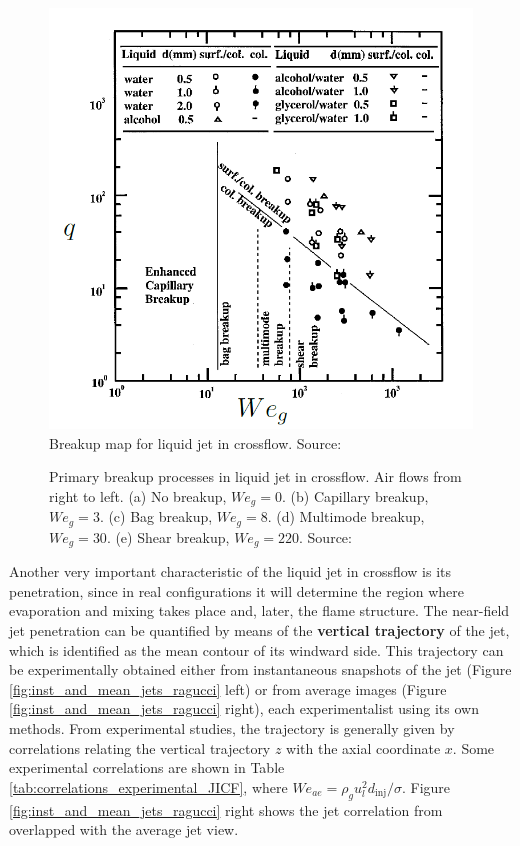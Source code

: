 \begin{figure}[h!]
	\centering
	\includegraphics[scale=0.55]{./part0_intro/jicf_breakup_regime_wu}
	\caption{Breakup map for liquid jet in crossflow. Source: \citeColor[wu_breakup_1997]}
	\label{fig:jicf_breakup_regime_wu}
\end{figure}

\begin{figure}[h!]
	\centering
	\caption[Primary breakup processes in liquid jet in crossflow]{Primary breakup processes in liquid jet in crossflow. Air flows from right to left. (a) No breakup, $We_g = 0$. (b) Capillary breakup, $We_g = 3$. (c) Bag breakup, $We_g = 8$. (d) Multimode breakup, $We_g = 30$. (e) Shear breakup, $We_g = 220$. Source: }
	\label{fig:jicf_breakup_sallam}
\end{figure}

Another very important characteristic of the liquid jet in crossflow is its penetration, since in real configurations it will determine the region where evaporation and mixing takes place and, later, the flame structure. The near-field jet penetration can be quantified by means of the \textbf{vertical trajectory} of the jet, which is identified as the mean contour of its windward side. This trajectory can be experimentally obtained either from instantaneous snapshots of the jet (Figure \ref{fig:inst_and_mean_jets_ragucci} left) or from average images (Figure \ref{fig:inst_and_mean_jets_ragucci} right), each experimentalist using its own methods. From experimental studies, the trajectory is generally given by correlations relating the vertical trajectory $z$ with the axial coordinate $x$. Some experimental correlations are shown in Table \ref{tab:correlations_experimental_JICF}, where $We_{ae} = \rho_g u_l^2 d_\mathrm{inj}/\sigma$. Figure \ref{fig:inst_and_mean_jets_ragucci} right shows the jet correlation from  overlapped with the average jet view.


